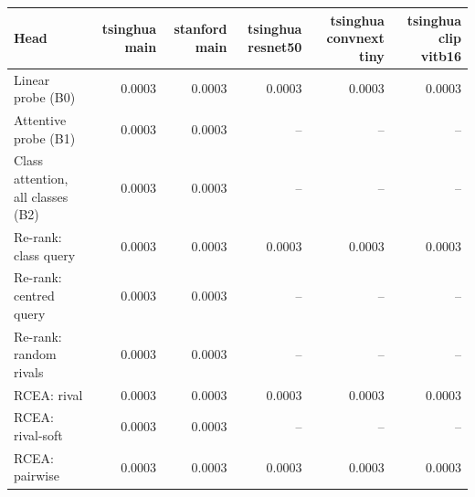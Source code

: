 \begin{tabular}{lrrrrr}
\toprule
Head & tsinghua main & stanford main & tsinghua resnet50 & tsinghua convnext tiny & tsinghua clip vitb16 \\
\midrule
Linear probe (B0) & 0.0003 & 0.0003 & 0.0003 & 0.0003 & 0.0003 \\
Attentive probe (B1) & 0.0003 & 0.0003 & -- & -- & -- \\
Class attention, all classes (B2) & 0.0003 & 0.0003 & -- & -- & -- \\
Re-rank: class query & 0.0003 & 0.0003 & 0.0003 & 0.0003 & 0.0003 \\
Re-rank: centred query & 0.0003 & 0.0003 & -- & -- & -- \\
Re-rank: random rivals & 0.0003 & 0.0003 & -- & -- & -- \\
RCEA: rival & 0.0003 & 0.0003 & 0.0003 & 0.0003 & 0.0003 \\
RCEA: rival-soft & 0.0003 & 0.0003 & -- & -- & -- \\
RCEA: pairwise & 0.0003 & 0.0003 & 0.0003 & 0.0003 & 0.0003 \\
\bottomrule
\end{tabular}
